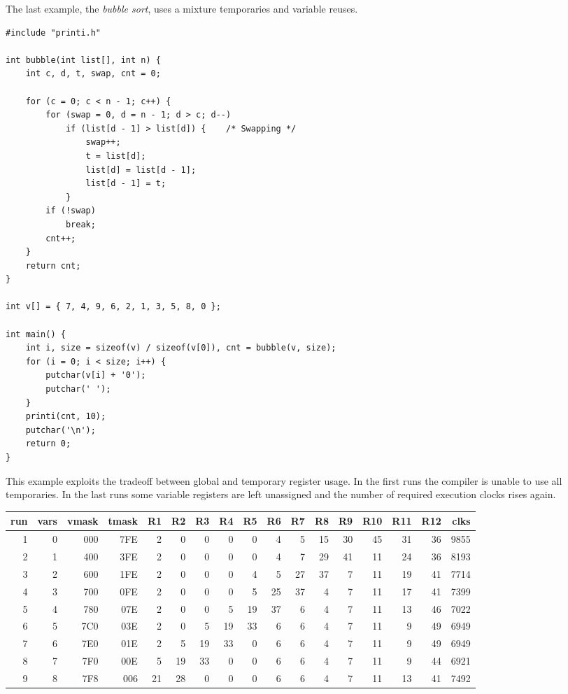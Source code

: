 The last example, the {\it bubble sort}, uses a mixture temporaries and variable
reuses. %

\begin{verbatim}
#include "printi.h"

int bubble(int list[], int n) {
    int c, d, t, swap, cnt = 0;

    for (c = 0; c < n - 1; c++) {
        for (swap = 0, d = n - 1; d > c; d--)
            if (list[d - 1] > list[d]) {    /* Swapping */
                swap++;
                t = list[d];
                list[d] = list[d - 1];
                list[d - 1] = t;
            }
        if (!swap)
            break;
        cnt++;
    }
    return cnt;
}

int v[] = { 7, 4, 9, 6, 2, 1, 3, 5, 8, 0 };

int main() {
    int i, size = sizeof(v) / sizeof(v[0]), cnt = bubble(v, size);
    for (i = 0; i < size; i++) {
        putchar(v[i] + '0');
        putchar(' ');
    }
    printi(cnt, 10);
    putchar('\n');
    return 0;
}
\end{verbatim}

This example exploits the tradeoff between global and temporary register
usage.
In the first runs the compiler is unable to use all temporaries.
In the last runs some variable registers are left unassigned and the number
of required execution clocks rises again.

\begin{center}
{\small
\begin{tabular}{r|r|r|r|r|r|r|r|r|r|r|r|r|r|r|r|r}
run&vars&vmask&tmask&R1&R2&R3&R4&R5&R6&R7&R8&R9&R10&R11&R12&clks\\\hline
1&0&000&7FE&2&0&0&0&0&4&5&15&30&45&31&36&9855\\
2&1&400&3FE&2&0&0&0&0&4&7&29&41&11&24&36&8193\\
3&2&600&1FE&2&0&0&0&4&5&27&37&7&11&19&41&7714\\
4&3&700&0FE&2&0&0&0&5&25&37&4&7&11&17&41&7399\\
5&4&780&07E&2&0&0&5&19&37&6&4&7&11&13&46&7022\\
6&5&7C0&03E&2&0&5&19&33&6&6&4&7&11&9&49&6949\\
7&6&7E0&01E&2&5&19&33&0&6&6&4&7&11&9&49&6949\\
8&7&7F0&00E&5&19&33&0&0&6&6&4&7&11&9&44&6921\\
9&8&7F8&006&21&28&0&0&0&6&6&4&7&11&13&41&7492\\
\end{tabular}
}
\end{center}
\vspace*{5mm}

